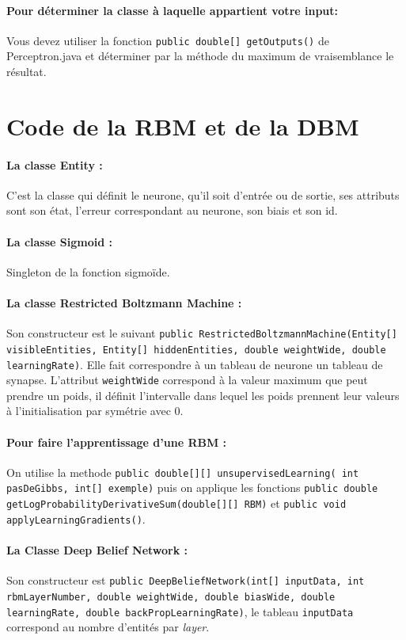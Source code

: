 \documentclass[a4paper,oneside]{report}
\begin{document}
\paragraph*{Pour déterminer la classe à laquelle appartient votre input:} Vous devez utiliser la fonction \texttt{public double[] getOutputs()} de Perceptron.java et déterminer par la méthode du maximum de vraisemblance le résultat.

\section{Code de la RBM et de la DBM}

\paragraph*{La classe Entity :} C'est la classe qui définit le neurone, qu'il soit d'entrée ou de sortie, ses attributs sont son état, l'erreur correspondant au neurone, son biais et son id.

\paragraph*{La classe Sigmoid :} Singleton de la fonction sigmoïde.

\paragraph*{La classe Restricted Boltzmann Machine :} Son constructeur est le suivant \texttt{public RestrictedBoltzmannMachine(Entity[] visibleEntities, Entity[] hiddenEntities, double weightWide, double learningRate)}. Elle fait correspondre à un tableau de neurone un tableau de synapse. L'attribut  \texttt{weightWide} correspond à la valeur maximum que peut prendre un poids, il définit l'intervalle dans lequel les poids prennent leur valeurs à l'initialisation par symétrie avec 0.

\paragraph*{Pour faire l'apprentissage d'une RBM :} On utilise la methode \texttt{public double[][] unsupervisedLearning( int pasDeGibbs, int[] exemple)} puis on applique les fonctions \texttt{public double getLogProbabilityDerivativeSum(double[][] RBM)} et \texttt{public void applyLearningGradients()}.

\paragraph*{La Classe Deep Belief Network :} Son constructeur est \texttt{public DeepBeliefNetwork(int[] inputData, int rbmLayerNumber, double weightWide, double biasWide, double learningRate, double backPropLearningRate)}, le tableau \texttt{inputData} correspond au nombre d'entités par \textit{layer}. 
\end{document}
